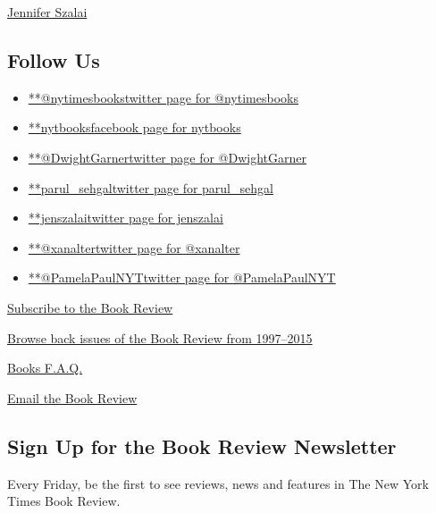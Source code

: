 \href{https://www.nytimes3xbfgragh.onion/by/jennifer-szalai}{Jennifer
Szalai}

\hypertarget{follow-us}{%
\subsection{Follow Us}\label{follow-us}}

\begin{itemize}
\tightlist
\item
  \href{https://twitter.com/nytimesbooks}{**@nytimesbookstwitter page
  for @nytimesbooks}
\item
  \href{https://www.facebookcorewwwi.onion/nytbooks}{**nytbooksfacebook
  page for nytbooks}
\item
  \href{https://twitter.com/DwightGarner}{**@DwightGarnertwitter page
  for @DwightGarner}
\item
  \href{https://twitter.com/parul_sehgal}{**parul\_sehgaltwitter page
  for parul\_sehgal}
\item
  \href{https://twitter.com/jenszalai}{**jenszalaitwitter page for
  jenszalai}
\item
  \href{https://twitter.com/xanalter}{**@xanaltertwitter page for
  @xanalter}
\item
  \href{https://twitter.com/PamelaPaulNYT}{**@PamelaPaulNYTtwitter page
  for @PamelaPaulNYT}
\end{itemize}

\href{https://homedelivery.nytimes3xbfgragh.onion/HDS/BookReviewHome.do?mode=BookReviewHome\&ref=review}{Subscribe
to the Book Review}

\href{https://www.nytimes3xbfgragh.onion/2014/07/29/books/review/the-new-york-times-book-review-back-issues.html}{Browse
back issues of the Book Review from 1997--2015}

\href{https://www.nytimes3xbfgragh.onion/membercenter/faq/books.html?ref=review}{Books
F.A.Q.}

\href{mailto:books@NYTimes.com}{Email the Book Review}

\hypertarget{sign-up-for-the-book-review-newsletter}{%
\subsection{Sign Up for the Book Review
Newsletter}\label{sign-up-for-the-book-review-newsletter}}

Every Friday, be the first to see reviews, news and features in The New
York Times Book Review.

